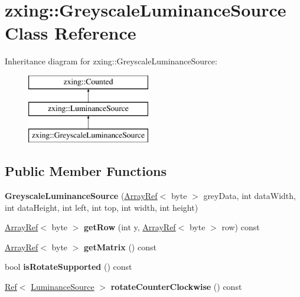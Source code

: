 \hypertarget{classzxing_1_1_greyscale_luminance_source}{}\section{zxing\+:\+:Greyscale\+Luminance\+Source Class Reference}
\label{classzxing_1_1_greyscale_luminance_source}
Inheritance diagram for zxing\+:\+:Greyscale\+Luminance\+Source\+:\begin{figure}[H]
\begin{center}
\leavevmode
\includegraphics[height=3.000000cm]{classzxing_1_1_greyscale_luminance_source}
\end{center}
\end{figure}
\subsection*{Public Member Functions}
\begin{DoxyCompactItemize}
\item 
\mbox{\label{classzxing_1_1_greyscale_luminance_source_acbf99020c6596c5faa449f959d4bc283}} 
{\bfseries Greyscale\+Luminance\+Source} (\mbox{\hyperlink{classzxing_1_1_array_ref}{Array\+Ref}}$<$ byte $>$ grey\+Data, int data\+Width, int data\+Height, int left, int top, int width, int height)
\item 
\mbox{\label{classzxing_1_1_greyscale_luminance_source_a9c03e7ab7367b3ef5a30e2215c2e3dfd}} 
\mbox{\hyperlink{classzxing_1_1_array_ref}{Array\+Ref}}$<$ byte $>$ {\bfseries get\+Row} (int y, \mbox{\hyperlink{classzxing_1_1_array_ref}{Array\+Ref}}$<$ byte $>$ row) const
\item 
\mbox{\label{classzxing_1_1_greyscale_luminance_source_a471969dea392bff782a79e91f72dd474}} 
\mbox{\hyperlink{classzxing_1_1_array_ref}{Array\+Ref}}$<$ byte $>$ {\bfseries get\+Matrix} () const
\item 
\mbox{\label{classzxing_1_1_greyscale_luminance_source_a0feadaf77ef0ac19cb083ec1c65d5da7}} 
bool {\bfseries is\+Rotate\+Supported} () const
\item 
\mbox{\label{classzxing_1_1_greyscale_luminance_source_a7f60a3314c18e34419dff9ec44be0f1d}} 
\mbox{\hyperlink{classzxing_1_1_ref}{Ref}}$<$ \mbox{\hyperlink{classzxing_1_1_luminance_source}{Luminance\+Source}} $>$ {\bfseries rotate\+Counter\+Clockwise} () const
\end{DoxyCompactItemize}


